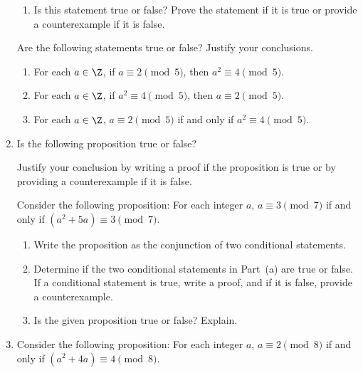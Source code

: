 \begin{enumerate}
\begin{enumerate}
    \item Is this statement true or false?  Prove the statement if it is true or provide a counterexample if it is false.
  \end{enumerate}

\xitem Are the following statements true or false?  Justify your conclusions.  %
\label{exer:sec32-4}%
  \begin{enumerate}
   \item For each $a \in \Z$, if  $a \equiv 2 \pmod 5$, then  $a^2  \equiv 4 \pmod 5$.
   \item For each $a \in \Z$, if  $a^2  \equiv 4 \pmod 5$, then  
$a \equiv 2 \pmod 5$.
   \item For each $a \in \Z$, $a \equiv 2 \pmod 5$ if and only if   $a^2  \equiv 4 \pmod 5$.
  \end{enumerate}

\item Is the following proposition true or false?
\label{exer:sec32-abeven}%
Justify your conclusion by writing a proof if the proposition is true or by providing a counterexample if it is false.




\xitem Consider the following proposition:
\label{exer:sec32-congmod7}%
For each integer $a$, $a \equiv 3 \pmod 7$ if and only if 
$\left( a^2 + 5a \right) \equiv 3 \pmod 7$.

\begin{enumerate}
\item Write the proposition as the conjunction of two conditional statements.
\item Determine if the two conditional statements in Part~(a) are true or false.  If a conditional statement is true, write a proof, and if it is false, provide a counterexample.
\item Is the given proposition true or false?  Explain.
\end{enumerate}


\item Consider the following proposition:
\label{exer:sec32-congmod8}%
For each integer $a$, $a \equiv 2 \pmod 8$ if and only if $\left(a^2 + 4a \right) \equiv 4 \pmod 8$.


\end{enumerate}
